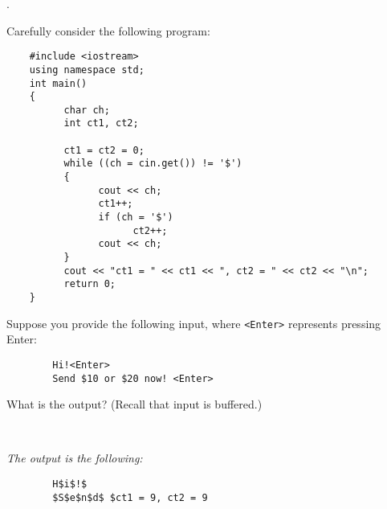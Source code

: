 \documentclass{amsart}
\begin{document}
\vfill
{}. 
\begin{minipage}[t]{11.5 cm}
	Carefully consider the following program:
	\begin{verbatim}
	#include <iostream>
	using namespace std;
	int main()
	{
	      char ch;
	      int ct1, ct2;
	
	      ct1 = ct2 = 0;
	      while ((ch = cin.get()) != '$')
	      {
	            cout << ch;
	            ct1++;
	            if (ch = '$')
	                  ct2++;
	            cout << ch;
	      }
	      cout << "ct1 = " << ct1 << ", ct2 = " << ct2 << "\n";
	      return 0;
	}
	\end{verbatim}
	Suppose you provide the following input, where \verb+<Enter>+ represents pressing Enter:
	\begin{verbatim}
		Hi!<Enter>
		Send $10 or $20 now! <Enter>
	\end{verbatim}
	What is the output? (Recall that input is buffered.)
\end{minipage} \\[1ex]
\phantom{3. } 
\begin{minipage}[t]{11.5 cm}
	{\slshape The output is the following:}
	\begin{verbatim}
		H$i$!$
		$S$e$n$d$ $ct1 = 9, ct2 = 9
	\end{verbatim} 
\end{minipage} 
\\[.2cm]
\vfill
\end{document}
